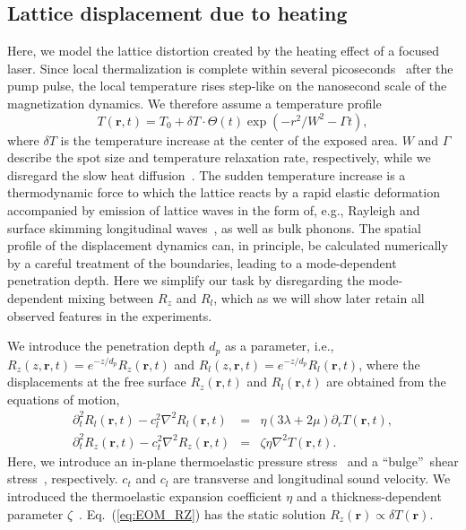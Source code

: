 \documentclass[aps,prb,twocolumn,superscriptaddress,floatfix]{revtex4}%
\def\be{\begin{equation}}
\def\ee{\end{equation}}
\def\ber{\begin{eqnarray}}
\def\eer{\end{eqnarray}}
\begin{document}
\subsection{Lattice displacement due to heating}
Here, we model the lattice distortion created by the heating effect of a focused laser. Since local thermalization is complete within several picoseconds~\cite{Zijlstra13} after the pump pulse, the local temperature rises step-like on the nanosecond scale of the magnetization dynamics. We therefore assume a temperature profile
\be
T(\mathbf{r},t)=T_0+\delta T\cdot\Theta(t)\exp(-r^{2}/W^{2}-\Gamma t),
\ee 
where $\delta T$ is the temperature increase at the center of the exposed area. $W$ and $\Gamma$ describe the spot size and temperature relaxation rate, respectively, while we disregard the slow heat diffusion~\cite{Ogawa15}. The sudden temperature increase is a thermodynamic force to which the lattice reacts by a rapid elastic deformation accompanied by emission of lattice waves in the form of, e.g., Rayleigh and surface skimming longitudinal waves~\cite{Janusonis16}, as well as bulk phonons. The spatial profile of the displacement dynamics can, in principle, be calculated numerically by a careful treatment of the boundaries, leading to a mode-dependent penetration depth. Here we simplify our task by disregarding the mode-dependent mixing between $R_z$ and $R_l$, which as we will show later retain all observed features in the experiments.

We introduce the penetration depth $d_p$
as a parameter, i.e., $R_z(z,\mathbf r,t)=e^{-z/d_p}R_z(\mathbf r,t)$ and $R_l(z,\mathbf r,t)=e^{-z/d_p}R_l(\mathbf r,t)$, where the displacements at the free surface $R_z(\mathbf r,t)$ and $R_l(\mathbf r,t)$ are obtained from the equations of motion,
\ber
\partial_{t}^{2}R_{l}(\mathbf{r},t)-c_{l}^{2}\nabla^{2}R_{l}(\mathbf{r},t)&=&\eta(3\lambda+2\mu)\partial_{r}T(\mathbf{r},t),
\label{eq:EOM_Rl}\\
\partial_{t}^{2}R_{z}(\mathbf{r},t)-c_{t}^{2}\nabla^{2}R_{z}(\mathbf{r},t)&=&\zeta\eta\nabla^{2}T(\mathbf{r},t).\label{eq:EOM_RZ}
\eer
Here, we introduce an in-plane thermoelastic pressure stress~\cite{Davies93,Rossignol05} and a \textquotedblleft bulge\textquotedblright\ shear stress~\cite{Dewhurst82}, respectively. $c_t$ and $c_l$ are transverse and longitudinal sound velocity. We introduced the thermoelastic expansion coefficient $\eta$ and a thickness-dependent parameter $\zeta$~\cite{Shen15}. Eq.~(\ref{eq:EOM_RZ}) has the static solution $R_z(\mathbf r)\propto \delta T(\mathbf r)$.
\end{document}
